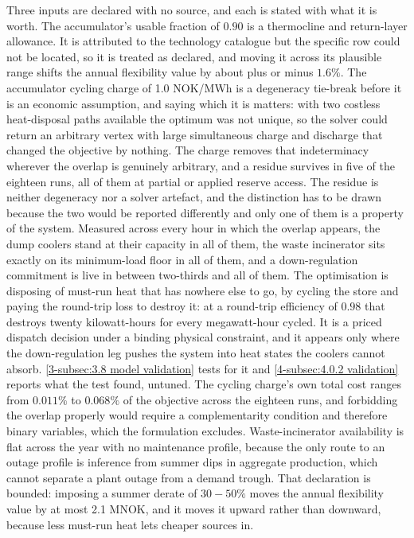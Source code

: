 Three inputs are declared with no source, and each is stated with what it is worth. The accumulator's usable fraction of $0.90$ is a thermocline and return-layer allowance. It is attributed to the technology catalogue but the specific row could not be located, so it is treated as declared, and moving it across its plausible range shifts the annual flexibility value by about plus or minus $1.6\%$. The accumulator cycling charge of 1.0 NOK/MWh is a degeneracy tie-break before it is an economic assumption, and saying which it is matters: with two costless heat-disposal paths available the optimum was not unique, so the solver could return an arbitrary vertex with large simultaneous charge and discharge that changed the objective by nothing. The charge removes that indeterminacy wherever the overlap is genuinely arbitrary, and a residue survives in five of the eighteen runs, all of them at partial or applied reserve access. The residue is neither degeneracy nor a solver artefact, and the distinction has to be drawn because the two would be reported differently and only one of them is a property of the system. Measured across every hour in which the overlap appears, the dump coolers stand at their capacity in all of them, the waste incinerator sits exactly on its minimum-load floor in all of them, and a down-regulation commitment is live in between two-thirds and all of them. The optimisation is disposing of must-run heat that has nowhere else to go, by cycling the store and paying the round-trip loss to destroy it: at a round-trip efficiency of $0.98$ that destroys twenty kilowatt-hours for every megawatt-hour cycled. It is a priced dispatch decision under a binding physical constraint, and it appears only where the down-regulation leg pushes the system into heat states the coolers cannot absorb. \autoref{3-subsec:3.8 model validation} tests for it and \autoref{4-subsec:4.0.2 validation} reports what the test found, untuned. The cycling charge's own total cost ranges from $0.011\%$ to $0.068\%$ of the objective across the eighteen runs, and forbidding the overlap properly would require a complementarity condition and therefore binary variables, which the formulation excludes. Waste-incinerator availability is flat across the year with no maintenance profile, because the only route to an outage profile is inference from summer dips in aggregate production, which cannot separate a plant outage from a demand trough. That declaration is bounded: imposing a summer derate of $30 - 50\%$ moves the annual flexibility value by at most 2.1 MNOK, and it moves it upward rather than downward, because less must-run heat lets cheaper sources in.

